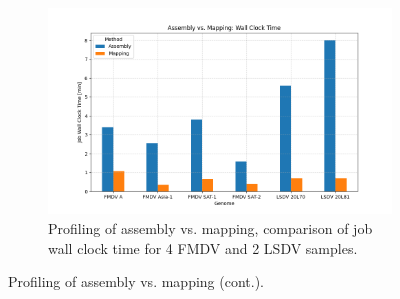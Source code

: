 \begin{figure}[ht]\ContinuedFloat
    \centering
	\begin{subfigure}[b]{1.0\textwidth}
        \includegraphics[width=1.0\textwidth]{media/4-profiling-wallclock.png}
        \caption{Profiling of assembly vs. mapping, comparison of job wall clock time for 4 FMDV and 2 LSDV samples.}
        \label{fig:4-profiling-wallclock}
    \end{subfigure}
    \caption{Profiling of assembly vs. mapping (cont.).}
    \label{fig:apx-profiling}
\end{figure}
